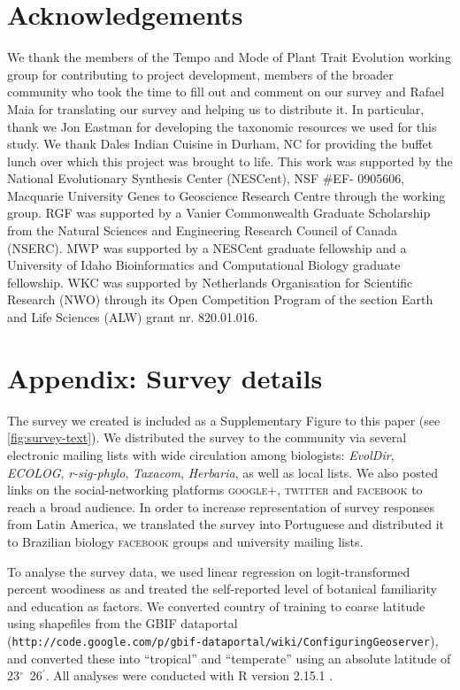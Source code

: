 \documentclass[a4paper,12pt]{article}
\begin{document}
\section{Acknowledgements}

We thank the members of the Tempo and Mode of Plant Trait
Evolution working group for contributing to project development,
members of the broader community who took the time to fill out and
comment on our survey and Rafael Maia for translating our survey and
helping us to distribute it.  In particular, thank we Jon Eastman for 
developing the taxonomic resources we used for this study.
%
We thank Dales Indian Cuisine in Durham, NC for providing the buffet
lunch over which this project was brought to life.
%
This work was supported by the National Evolutionary Synthesis Center
(NESCent), NSF \#EF- 0905606, Macquarie University Genes to Geoscience
Research Centre through the working group.
%
RGF was supported by a Vanier Commonwealth Graduate Scholarship from
the Natural Sciences and Engineering Research Council of Canada
(NSERC).
MWP was supported by a NESCent graduate fellowship and a 
University of Idaho Bioinformatics and Computational Biology graduate fellowship.
%
WKC was supported by Netherlands Organisation for
Scientific Research (NWO) through its Open Competition Program of the
section Earth and Life Sciences (ALW) grant nr. 820.01.016.

\section{Appendix: Survey details}
%
The survey we created is included as a Supplementary Figure to
this paper (see \ref{fig:survey-text}). We distributed the survey to the 
community via several electronic
mailing lists with wide circulation among biologists: \emph{EvolDir},
\emph{ECOLOG}, \emph{\mbox{r-sig-phylo}}, \emph{Taxacom},
\emph{Herbaria}, as well as local lists. We also posted links on the
social-networking platforms \textsc{google+}, \textsc{twitter} and
\textsc{facebook} to reach a broad audience.
%
In order to increase representation of survey responses from Latin
America, we translated the survey into Portuguese and distributed it
to Brazilian biology \textsc{facebook} groups and university mailing
lists.

To analyse the survey data, we used linear regression on
logit-transformed percent woodiness as \citep[see][]{wartonarcsine}
and treated the self-reported level of botanical familiarity and
education as factors.  We converted country of training to coarse
latitude using shapefiles
from the GBIF dataportal\\
(\texttt{http://code.google.com/p/gbif-dataportal/wiki/ConfiguringGeoserver}),
and converted these into ``tropical'' and ``temperate'' using an
absolute latitude of 23$^\circ$~26$^\prime$.  All analyses were
conducted with R version 2.15.1 \citep{R}.
\end{document}
